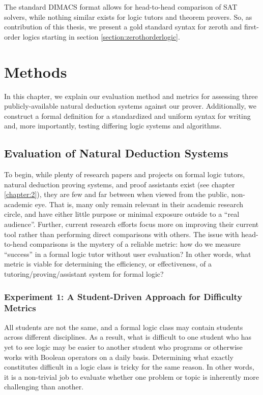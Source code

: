 \documentclass[ms]{uncgdissertationexp2}
\theoremstyle{plain}
\theoremstyle{definition}
\theoremstyle{remark}
\begin{document}
The standard DIMACS format allows for head-to-head comparison of SAT solvers, while nothing similar exists for logic tutors and theorem provers. So, as contribution of this thesis, we present a gold standard syntax for zeroth and first-order logics starting in section \ref{section:zerothorderlogic}.

\chapter{Methods}\label{chapter:3}
In this chapter, we explain our evaluation method and metrics for assessing three publicly-available natural deduction systems against our prover. Additionally, we construct a formal definition for a standardized and uniform syntax for writing and, more importantly, testing differing logic systems and algorithms.

\section{Evaluation of Natural Deduction Systems}
To begin, while plenty of research papers and projects on formal logic tutors, natural deduction proving systems, and proof assistants exist (see chapter \ref{chapter:2}), they are few and far between when viewed from the public, non-academic eye. That is, many only remain relevant in their academic research circle, and have either little purpose or minimal exposure outside to a ``real audience''. Further, current research efforts focus more on improving their current tool rather than performing direct comparisons with others. The issue with head-to-head comparisons is the mystery of a reliable metric: how do we measure ``success'' in a formal logic tutor without user evaluation? In other words, what metric is viable for determining the efficiency, or effectiveness, of a tutoring/proving/assistant system for formal logic?

\subsection{Experiment 1: A Student-Driven Approach for Difficulty Metrics}
All students are not the same, and a formal logic class may contain students across different disciplines. As a result, what is difficult to one student who has yet to see logic may be easier to another student who programs or otherwise works with Boolean operators on a daily basis. Determining what exactly constitutes difficult in a logic class is tricky for the same reason. In other words, it is a non-trivial job to evaluate whether one problem or topic is inherently more challenging than another.
\end{document}

